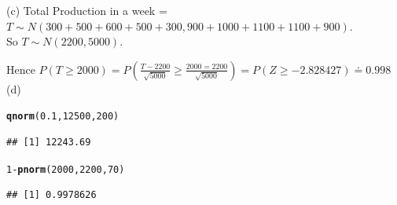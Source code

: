 \documentclass[bigtut]{tutorial}\usepackage[]{graphicx}\usepackage[]{color}
\makeatletter
\newcommand{\hlnum}[1]{\textcolor[rgb]{0.686,0.059,0.569}{#1}}%
\newcommand{\hlopt}[1]{\textcolor[rgb]{0,0,0}{#1}}%
\newcommand{\hlstd}[1]{\textcolor[rgb]{0.345,0.345,0.345}{#1}}%
\newcommand{\hlkwd}[1]{\textcolor[rgb]{0.737,0.353,0.396}{\textbf{#1}}}%
\newenvironment{kframe}{%
 \def\at@end@of@kframe{}%
 \ifinner\ifhmode%
  \def\at@end@of@kframe{\end{minipage}}%
  \begin{minipage}{\columnwidth}%
 \fi\fi%
 \def\FrameCommand##1{\hskip\@totalleftmargin \hskip-\fboxsep
 \colorbox{shadecolor}{##1}\hskip-\fboxsep
     \hskip-\linewidth \hskip-\@totalleftmargin \hskip\columnwidth}%
 \MakeFramed {\advance\hsize-\width
   \@totalleftmargin\z@ \linewidth\hsize
   \@setminipage}}%
 {\par\unskip\endMakeFramed%
 \at@end@of@kframe}
\newenvironment{knitrout}{}{} %
\makeatother
\begin{document}
\begin{tutorial}
\begin{questions}
\begin{solution}
(c)
Total Production in a week = $T \sim N( 300 + 500 + 600 +500 + 300, 900+1000+1100+1100+900)$. \\
So $T \sim N(2200, 5000)$.

Hence $P( T \geq 2000) = P( \frac{T-2200}{\sqrt{5000}} \geq \frac{2000=2200}{\sqrt{5000}})
= P(Z \geq -2.828427) \doteq 0.998$ \\

(d)
\begin{knitrout}
\color{fgcolor}\begin{kframe}
\begin{alltt}
\hlkwd{qnorm}\hlstd{(}\hlnum{0.1}\hlstd{,}\hlnum{12500}\hlstd{,}\hlnum{200}\hlstd{)}
\end{alltt}
\begin{verbatim}
## [1] 12243.69
\end{verbatim}
\begin{alltt}
\hlnum{1}\hlopt{-}\hlkwd{pnorm}\hlstd{(}\hlnum{2000}\hlstd{,}\hlnum{2200}\hlstd{,}\hlnum{70}\hlstd{)}
\end{alltt}
\begin{verbatim}
## [1] 0.9978626
\end{verbatim}
\end{kframe}
\end{knitrout}

\end{solution}














\end{questions}

\end{tutorial}
\end{document}
